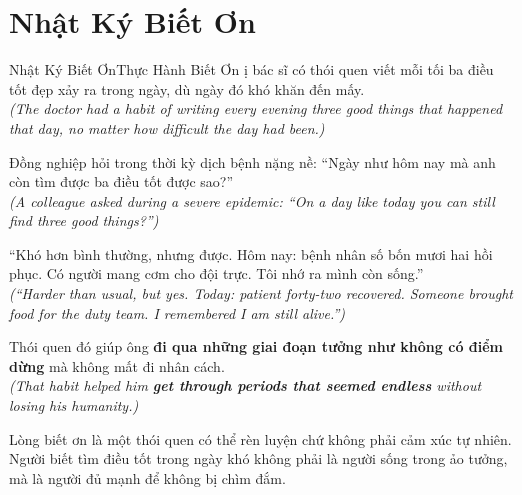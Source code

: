 \section{Nhật Ký Biết Ơn}
\begin{truyen}{Nhật Ký Biết Ơn}{Thực Hành Biết Ơn}
ị bác sĩ có thói quen viết mỗi tối ba điều tốt đẹp xảy ra trong ngày, dù ngày đó khó khăn đến mấy.\\
\textit{(The doctor had a habit of writing every evening three good things that happened that day, no matter how difficult the day had been.)}

Đồng nghiệp hỏi trong thời kỳ dịch bệnh nặng nề: ``Ngày như hôm nay mà anh còn tìm được ba điều tốt được sao?''\\
\textit{(A colleague asked during a severe epidemic: ``On a day like today you can still find three good things?'')}

``Khó hơn bình thường, nhưng được. Hôm nay: bệnh nhân số bốn mươi hai hồi phục. Có người mang cơm cho đội trực. Tôi nhớ ra mình còn sống.''\\
\textit{(``Harder than usual, but yes. Today: patient forty-two recovered. Someone brought food for the duty team. I remembered I am still alive.'')}

Thói quen đó giúp ông \textbf{đi qua những giai đoạn tưởng như không có điểm dừng} mà không mất đi nhân cách.\\
\textit{(That habit helped him \textbf{get through periods that seemed endless} without losing his humanity.)}
\end{truyen}
\begin{baihoc}
  Lòng biết ơn là một thói quen có thể rèn luyện chứ không phải cảm xúc tự nhiên. Người biết tìm điều tốt trong ngày khó không phải là người sống trong ảo tưởng, mà là người đủ mạnh để không bị chìm đắm.
\end{baihoc}

